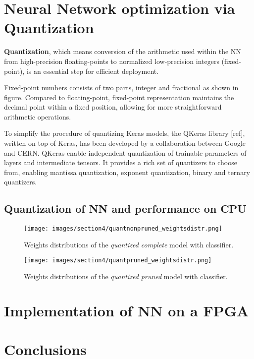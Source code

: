 \documentclass{article}
\begin{document}
\section{Neural Network optimization via Quantization}

\textbf{Quantization}, which means conversion of the arithmetic used within the NN from high-precision floating-points 
to normalized low-precision integers (fixed-point), is an essential step for efficient deployment.
\par Fixed-point numbers consists of two parts, integer and fractional as shown in figure.
Compared to floating-point, fixed-point representation maintains
the decimal point within a fixed position, allowing for more straightforward
arithmetic operations.
\par To simplify the procedure of quantizing Keras models, the QKeras library [ref], written on top of Keras,
has been developed by a collaboration between Google and CERN.
QKeras enable independent quantization of trainable parameters of layers and intermediate tensors.
It provides a rich set of quantizers to choose from, enabling mantissa quantization, exponent quantization, binary and ternary quantizers. 

\subsection{Quantization of NN and performance on CPU}

\begin{figure}[H]
  \centering
  \texttt{[image: images/section4/quantnonpruned\_weightsdistr.png]}
  \caption{Weights distributions of the \textit{quantized complete} model with classifier.}
  \label{fig:quantprun_weights}
\end{figure}

\begin{figure}[H]
  \centering
  \texttt{[image: images/section4/quantpruned\_weightsdistr.png]}
  \caption{Weights distributions of the \textit{quantized pruned} model with classifier.}
  \label{fig:quantprun_weights}
\end{figure}

\section{Implementation of NN on a FPGA}





\section{Conclusions}






\end{document}
